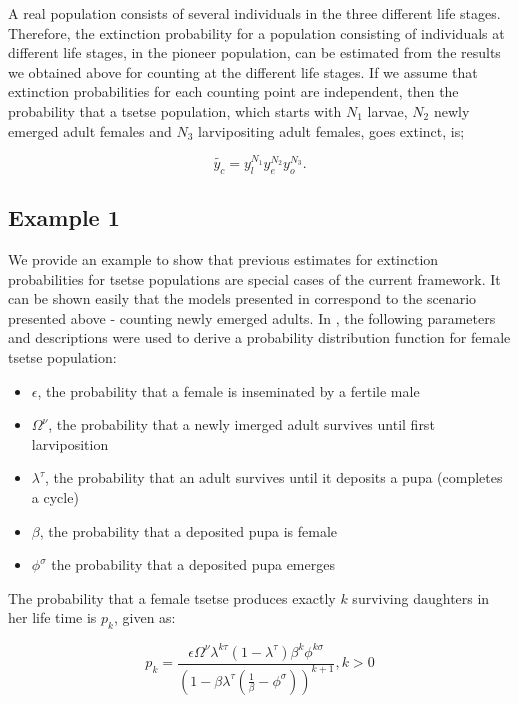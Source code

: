 \documentclass[smallextended]{svjour3}
\begin{document}
A real population consists of several individuals in the three different life stages. Therefore, the  extinction probability for a population consisting of individuals at different life stages, in the pioneer population, can be estimated  from the results we obtained above for  counting at the different life stages.  If we assume that extinction probabilities for each counting point are independent, then the probability that a tsetse population, which starts with $N_1$ larvae, $N_2$ newly emerged adult females and $N_3$ larvipositing adult females, goes extinct, is; 


$$\tilde{y_c} = y_{l}^{N_1}y_{e}^{N_2}y_{o}^{N_3}.$$ 


\subsection{Example 1}

We provide an example to show that previous estimates for extinction probabilities for tsetse populations are special cases of the current framework. It can be shown easily that the models presented in \cite{Hargrove2005a,Kajunguri2019,Are2019} correspond to the scenario presented above - counting newly emerged adults. In \cite{Are2019}, the following parameters and descriptions were used to derive a probability distribution function for female tsetse population: 
\begin{itemize}
	\item $\epsilon$, the probability that a female is inseminated by a fertile male 
	\item $\Omega^{\nu}$,  the probability that a newly imerged adult survives until first larviposition
	\item $ \lambda^{\tau}$, the probability that an adult survives until it deposits a pupa (completes a cycle)
	\item $\beta$,  the probability that a deposited pupa is female 
	\item $\phi^{\sigma}$  the probability that a deposited pupa emerges
\end{itemize}

The probability that a female tsetse produces exactly $k$ surviving daughters in her life time is $p_{k}$, given as:

\begin{equation}
\label{Johnframework}
p_{k}= \frac{\epsilon \Omega^{\nu}\lambda^{k\tau}(1-\lambda^{\tau})\beta^{k}\phi^{k\sigma}}{(1-\beta \lambda^\tau(\frac{1}{\beta} -\phi^{\sigma}))^{k+1}},   k>0   
\end{equation}
\end{document}

